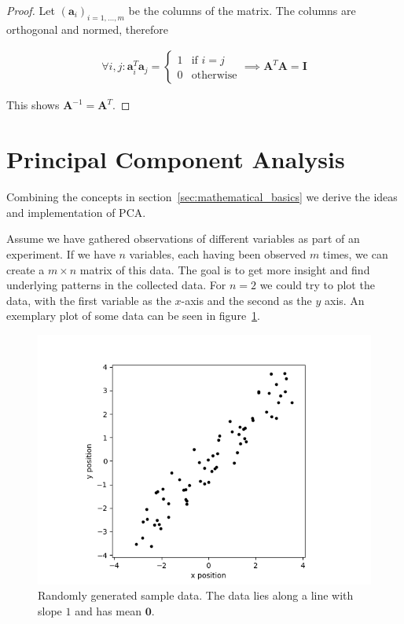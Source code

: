 \documentclass[a4paper]{IEEEtran}
\begin{document}
\begin{proof}
	Let $(\mathbf{a}_i)_{i=1,...,m}$ be the columns of the matrix. The columns are orthogonal and normed, therefore
	
	\begin{align*}
		\forall i,j: \mathbf{a}_i^T\mathbf{a}_j = \begin{cases}
			1 & \text{if } i=j\\
			0 & \text{otherwise}
		\end{cases} \implies \mathbf{A}^T\mathbf{A} = \mathbf{I}
	\end{align*}
	
	This shows $\mathbf{A}^{-1} = \mathbf{A}^T$.
\end{proof}

\section{Principal Component Analysis}
\label{sec:principal_component_analysis}

Combining the concepts in section~\ref{sec:mathematical_basics} we derive the ideas and implementation of PCA.

Assume we have gathered observations of different variables as part of an experiment. If we have $n$ variables, each having been observed $m$ times, we can create a $m \times n$ matrix of this data. The goal is to get more insight and find underlying patterns in the collected data. For $n = 2$ we could try to plot the data, with the first variable as the $x$-axis and the second as the $y$ axis. An exemplary plot of some data can be seen in figure~\ref{fig:some_nice_data}.

\begin{figure}
	\centering
	\includegraphics[width=\linewidth]{figs/some_nice_data_org}
	\caption{Randomly generated sample data. The data lies along a line with slope $1$ and has mean $\mathbf{0}$.}
	\label{fig:some_nice_data}
\end{figure}
\end{document}
